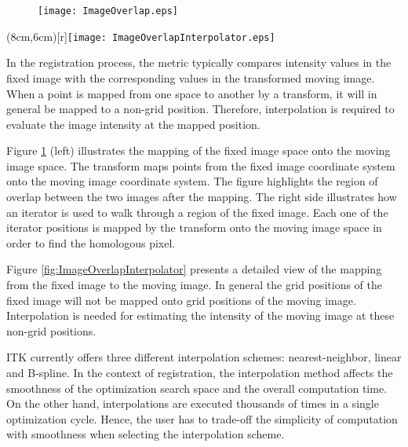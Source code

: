% 
%

\begin{figure}
\center
\texttt{[image: ImageOverlap.eps]}
\label{fig:ImageOverlapIterator}
\end{figure}


\parpic(8cm,6cm)[r]{\texttt{[image: ImageOverlapInterpolator.eps]}}

In the registration process, the metric typically compares intensity values 
in the fixed image with the corresponding values in the transformed moving
image. When a point is mapped from one space to another by a transform,
it will in general be mapped to a non-grid position. Therefore, interpolation
is required to evaluate the image intensity at the mapped position.

Figure \ref{fig:ImageOverlapIterator} (left) illustrates the mapping of the
fixed image space onto the moving image space. The transform maps points from
the fixed image coordinate system onto the moving image coordinate system. The
figure highlights the region of overlap between the two images after the
mapping. The right side illustrates how an iterator is used to walk through a
region of the fixed image. Each one of the iterator positions is mapped by the
transform onto the moving image space in order to find the homologous pixel.

Figure \ref{fig:ImageOverlapInterpolator} presents a detailed view of the
mapping from the fixed image to the moving image. In general the grid positions
of the fixed image will not be mapped onto grid positions of the moving image.
Interpolation is needed for estimating the intensity of the moving image at
these non-grid positions.


ITK currently offers three different interpolation schemes: nearest-neighbor,
linear and B-spline. In the context of registration, the interpolation method
affects the smoothness of the optimization search space and the overall
computation time. On the other hand, interpolations are executed thousands of
times in a single optimization cycle. Hence, the user has to trade-off the
simplicity of computation with smoothness when selecting the interpolation 
scheme.

